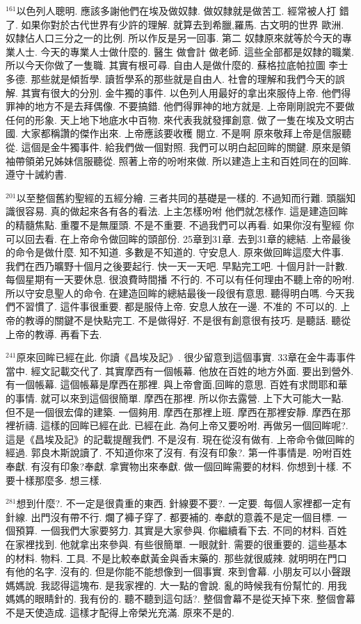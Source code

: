 \documentclass{book}
\begin{document}
$^{161}$以色列人聰明.
應該多謝他們在埃及做奴隸.
做奴隸就是做苦工.
經常被人打 錯了.
如果你對於古代世界有少許的理解.
就算去到希臘,羅馬.
古文明的世界 歐洲.
奴隸佔人口三分之一的比例.
所以作反是另一回事.
第二 奴隸原來就等於今天的專業人士.
今天的專業人士做什麼的.
醫生 做會計 做老師.
這些全部都是奴隸的職業.
所以今天你做了一隻職.
其實有根可尋.
自由人是做什麼的.
蘇格拉底帕拉圖 李士多德.
那些就是傾哲學.
讀哲學系的那些就是自由人.
社會的理解和我們今天的誤解.
其實有很大的分別.
金牛獨的事件.
以色列人用最好的拿出來服侍上帝.
他們得罪神的地方不是去拜偶像.
不要搞錯.
他們得罪神的地方就是.
上帝剛剛說完不要做任何的形象.
天上地下地底水中百物.
來代表我就發揮創意.
做了一隻在埃及文明古國.
大家都稱讚的傑作出來.
上帝應該要收穫 閱立.
不是啊 原來敬拜上帝是信服聽從.
這個是金牛獨事件.
給我們做一個對照.
我們可以明白起回眸的關鍵.
原來是領袖帶領弟兄姊妹信服聽從.
照著上帝的吩咐來做.
所以建造上主和百姓同在的回眸.
遵守十誡約書.

$^{201}$以至整個舊約聖經的五經分繪.
三者共同的基礎是一樣的.
不過知而行難.
頭腦知識很容易.
真的做起來各有各的看法.
上主怎樣吩咐 他們就怎樣作.
這是建造回眸的精髓焦點.
重覆不是無厘頭.
不是不重要.
不過我們可以再看.
如果你沒有聖經 你可以回去看.
在上帝命令做回眸的頭部份.
25章到31章.
去到31章的總結.
上帝最後的命令是做什麼.
知不知道.
多數是不知道的.
守安息人.
原來做回眸這麼大件事.
我們在西乃曠野十個月之後要起行.
快一天一天吧.
早點完工吧.
十個月計一計數.
每個星期有一天要休息.
很浪費時間播 不行的.
不可以有任何理由不聽上帝的吩咐.
所以守安息聖人的命令.
在建造回眸的總結最後一段很有意思.
聽得明白嗎.
今天我們不習慣了.
這件事很重要.
都是服侍上帝.
安息人放在一邊.
不准的 不可以的.
上帝的教導的關鍵不是快點完工.
不是做得好.
不是很有創意很有技巧.
是聽話.
聽從上帝的教導.
再看下去.

$^{241}$原來回眸已經在此.
你讀《昌埃及記》.
很少留意到這個事實.
33章在金牛毒事件當中.
經文記載交代了.
其實摩西有一個帳幕.
他放在百姓的地方外面.
要出到營外.
有一個帳幕.
這個帳幕是摩西在那裡.
與上帝會面,回眸的意思.
百姓有求問耶和華的事情.
就可以來到這個很簡單.
摩西在那裡.
所以你去露營.
上下大可能大一點.
但不是一個很宏偉的建築.
一個夠用.
摩西在那裡上班.
摩西在那裡安靜.
摩西在那裡祈禱.
這樣的回眸已經在此.
已經在此.
為何上帝又要吩咐.
再做另一個回眸呢?.
這是《昌埃及記》的記載提醒我們.
不是沒有.
現在從沒有做有.
上帝命令做回眸的經過.
郭良木斯說讀了.
不知道你來了沒有.
有沒有印象?.
第一件事情是.
吩咐百姓奉獻.
有沒有印象?奉獻.
拿實物出來奉獻.
做一個回眸需要的材料.
你想到十樣.
不要十樣那麼多.
想三樣.

$^{281}$想到什麼?.
不一定是很貴重的東西.
針線要不要?.
一定要.
每個人家裡都一定有針線.
出門沒有帶不行.
爛了褲子穿了.
都要補的.
奉獻的意義不是定一個目標.
一個預算.
一個我們大家要努力.
其實是大家參與.
你繼續看下去.
不同的材料.
百姓在家裡找到.
他就拿出來參與.
有些很簡單.
一眼就針.
需要的很重要的.
這些基本的材料.
物料.
工具.
不是比較奉獻黃金與香末藥的.
那些就很威辣.
就明明在門口有他的名字.
沒有的.
但是你能不能想像到一個事實.
來到會幕.
小朋友可以小聲跟媽媽說.
我認得這塊布.
是我家裡的.
大一點的會說.
亂的時候我有份幫忙的.
用我媽媽的眼睛針的.
我有份的.
聽不聽到這句話?.
整個會幕不是從天掉下來.
整個會幕不是天使造成.
這樣才配得上帝榮光充滿.
原來不是的.
\end{document}
